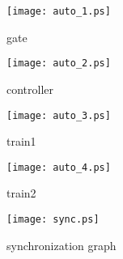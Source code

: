 \documentclass{article}
\begin{document}
\begin{figure}
\centering
\texttt{[image: auto\_1.ps]}
\caption{gate}
\end{figure}
\begin{figure}
\centering
\texttt{[image: auto\_2.ps]}
\caption{controller}
\end{figure}
\begin{figure}
\centering
\texttt{[image: auto\_3.ps]}
\caption{train1}
\end{figure}
\begin{figure}
\centering
\texttt{[image: auto\_4.ps]}
\caption{train2}
\end{figure}
\begin{figure}
\centering
\texttt{[image: sync.ps]}
\caption{synchronization graph}
\end{figure}
\end{document}
